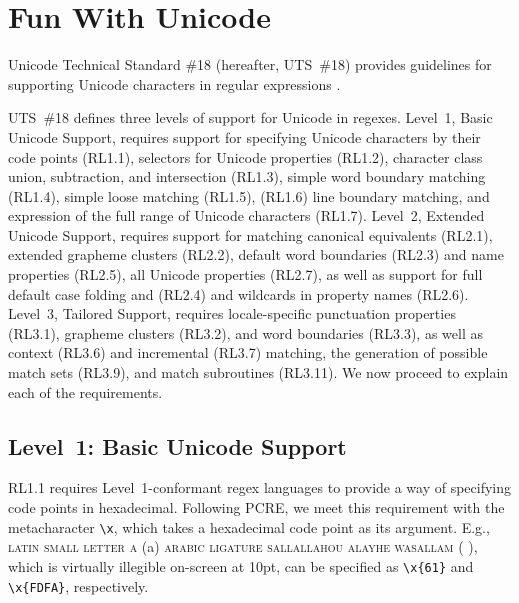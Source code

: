 \documentclass[5p,final,number,sort&compress]{elsarticle}
\newcommand{\re}[1]{\texttt{#1}}
\newcommand*{\whack}{\textbackslash}
\begin{document}
\section{Fun With Unicode}

Unicode Technical Standard \#18 (hereafter, UTS~\#18) provides guidelines for supporting Unicode characters in regular expressions \citep{uts18}.


UTS~\#18 defines three levels of support for Unicode in regexes. Level~1, Basic Unicode Support, requires support for specifying Unicode characters by their code points (RL1.1), selectors for Unicode properties (RL1.2), character class union, subtraction, and intersection (RL1.3), simple word boundary matching (RL1.4), simple loose matching (RL1.5), (RL1.6) line boundary matching, and expression of the full range of Unicode characters (RL1.7). Level~2, Extended Unicode Support, requires support for matching canonical equivalents (RL2.1), extended grapheme clusters (RL2.2), default word boundaries (RL2.3) and name properties (RL2.5), all Unicode properties (RL2.7), as well as support for full default case folding and (RL2.4) and wildcards in property names (RL2.6). Level~3, Tailored Support, requires locale-specific punctuation properties (RL3.1), grapheme clusters (RL3.2), and word boundaries (RL3.3), as well as context (RL3.6) and incremental (RL3.7) matching, the generation of possible match sets (RL3.9), and match subroutines (RL3.11). We now proceed to explain each of the requirements.

\subsection{Level~1: Basic Unicode Support}


RL1.1 requires Level~1-conformant regex languages to provide a way of specifying code points in hexadecimal. Following PCRE, we meet this requirement with the metacharacter \re{\whack x}, which takes a hexadecimal code point as its argument. E.g., \textsc{latin small letter a} (a) \textsc{arabic ligature sallallahou alayhe wasallam} ( 
), which is virtually illegible on-screen at 10pt, can be specified as \re{\whack x\{61\}} and \re{\whack x\{FDFA\}}, respectively.

\end{document}
